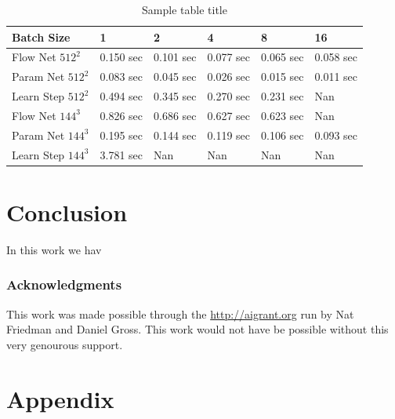 \documentclass{article} %
\begin{document}
\begin{table}[t]
\caption{Sample table title}
\label{computation_table}
\begin{center}
\begin{tabular}{l|lllll}
Batch Size & 1 & 2 & 4 & 8 & 16 \\ \hline 
Flow Net $512^2$ & 0.150 sec & 0.101 sec & 0.077 sec & 0.065 sec & 0.058 sec \\ 
Param Net $512^2$ & 0.083 sec & 0.045 sec & 0.026 sec & 0.015 sec & 0.011 sec \\ 
Learn Step $512^2$ & 0.494 sec & 0.345 sec & 0.270 sec & 0.231 sec & Nan \\ 
Flow Net $144^3$ & 0.826 sec & 0.686 sec & 0.627 sec & 0.623 sec & Nan \\ 
Param Net $144^3$ & 0.195 sec & 0.144 sec & 0.119 sec & 0.106 sec & 0.093 sec \\ 
Learn Step $144^3$ & 3.781 sec & Nan & Nan & Nan & Nan \\ 
\end{tabular}
\end{center}
\end{table}




\section{Conclusion}

In this work we hav

\subsubsection*{Acknowledgments}

This work was made possible through the \url{http://aigrant.org} run by Nat Friedman and Daniel Gross. This work would not have be possible without this very genourous support.




\section{Appendix}
\end{document}
